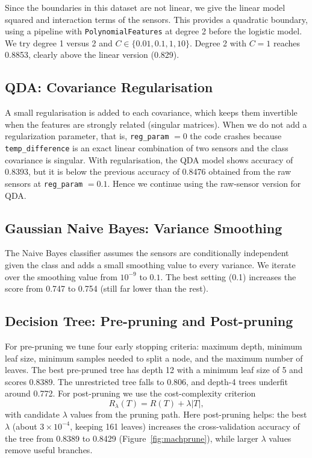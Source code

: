 \documentclass[11pt]{article}
\begin{document}
Since the boundaries in this dataset are not linear, we give the linear model squared and interaction terms of the sensors. This provides a quadratic boundary, using a pipeline with \texttt{PolynomialFeatures} at degree 2 before the logistic model. We try degree 1 versus 2 and $C \in \{0.01,0.1,1,10\}$. Degree 2 with $C=1$ reaches 0.8853, clearly above the linear version (0.829).

\subsection{QDA: Covariance Regularisation}

A small regularisation is added to each covariance, which keeps them invertible when the features are strongly related (singular matrices). When we do not add a regularization parameter, that is, \texttt{reg\_param} $=0$ the code crashes because \texttt{temp\_difference} is an exact linear combination of two sensors and the class covariance is singular. With regularisation, the QDA model shows accuracy of 0.8393, but it is below the previous accuracy of 0.8476 obtained from the raw sensors at \texttt{reg\_param} $=0.1$. Hence we continue using the raw-sensor version for QDA.

\subsection{Gaussian Naive Bayes: Variance Smoothing}

The Naive Bayes classifier assumes the sensors are conditionally independent given the class and adds a small smoothing value to every variance. We iterate over the smoothing value from $10^{-9}$ to $0.1$. The best setting (0.1) increases the score from 0.747 to 0.754 (still far lower than the rest).

\subsection{Decision Tree: Pre-pruning and Post-pruning}

For pre-pruning we tune four early stopping criteria: maximum depth, minimum leaf size, minimum samples needed to split a node, and the maximum number of leaves. The best pre-pruned tree has depth 12 with a minimum leaf size of 5 and scores 0.8389. The unrestricted tree falls to 0.806, and depth-4 trees underfit around 0.772. For post-pruning we use the cost-complexity criterion
\[
  R_\lambda(T) = R(T) + \lambda |T|,
\]
with candidate $\lambda$ values from the pruning path. Here post-pruning helps: the best $\lambda$ (about $3\times10^{-4}$, keeping 161 leaves) increases the cross-validation accuracy of the tree from 0.8389 to 0.8429 (Figure~\ref{fig:machprune}), while larger $\lambda$ values remove useful branches.
\end{document}
